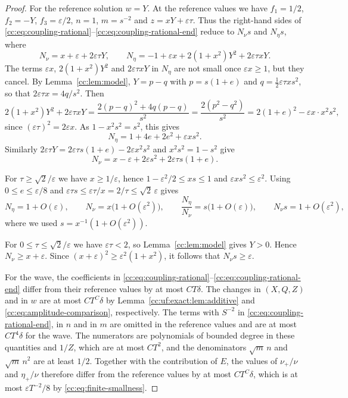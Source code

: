 \begin{proof}
For the reference solution $w=Y$. At the reference values we have
$f_1=1/2$, $f_2=-Y$, $f_3=\varepsilon/2$, $n=1$, $m=s^{-2}$ and
$z=xY+\varepsilon\tau$. Thus the right-hand sides of
\eqref{cc:eq:coupling-rational}--\eqref{cc:eq:coupling-rational-end}
reduce to $N_\nu s$ and $N_\eta s$, where
\[
 N_\nu=x+\varepsilon+2\varepsilon\tau Y,\qquad
 N_\eta=-1+\varepsilon x+2(1+x^2)Y^2+2\varepsilon\tau xY.
\]
The terms $\varepsilon x$, $2(1+x^2)Y^2$ and $2\varepsilon\tau xY$ in
$N_\eta$ are not small once $\varepsilon x\ge1$, but they cancel. By
Lemma~\ref{cc:lem:model}, $Y=p-q$ with $p=s(1+e)$ and
$q=\tfrac12\varepsilon\tau xs^2$, so that $2\varepsilon\tau x=4q/s^2$.
Then
\[
 2(1+x^2)Y^2+2\varepsilon\tau xY
 =\frac{2(p-q)^2+4q(p-q)}{s^2}=\frac{2(p^2-q^2)}{s^2}
 =2(1+e)^2-\varepsilon x\cdot x^2s^2,
\]
since $(\varepsilon\tau)^2=2\varepsilon x$. As $1-x^2s^2=s^2$, this
gives
\[
 N_\eta=1+4e+2e^2+\varepsilon xs^2.
\]
Similarly $2\varepsilon\tau Y=2\varepsilon\tau s(1+e)-2\varepsilon x^2s^2$
and $x^2s^2=1-s^2$ give
\[
 N_\nu=x-\varepsilon+2\varepsilon s^2+2\varepsilon\tau s(1+e).
\]

For $\tau\ge\sqrt2/\varepsilon$ we have $x\ge1/\varepsilon$, hence
$1-\varepsilon^2/2\le xs\le1$ and $\varepsilon xs^2\le\varepsilon^2$.
Using $0\le e\le\varepsilon/8$ and
$\varepsilon\tau s\le\varepsilon\tau/x=2/\tau\le\sqrt2\,\varepsilon$ gives
\[
 N_\eta=1+O(\varepsilon),\qquad N_\nu=x\bigl(1+O(\varepsilon^2)\bigr),
 \qquad \frac{N_\eta}{N_\nu}=s\bigl(1+O(\varepsilon)\bigr),
 \qquad N_\nu s=1+O(\varepsilon^2),
\]
where we used $s=x^{-1}(1+O(\varepsilon^2))$.

For $0\le\tau\le\sqrt2/\varepsilon$ we have $\varepsilon\tau<2$,
so Lemma~\ref{cc:lem:model} gives $Y>0$. Hence
$N_\nu\ge x+\varepsilon$. Since
$(x+\varepsilon)^2\ge\varepsilon^2(1+x^2)$, it follows that
$N_\nu s\ge\varepsilon$.

For the wave, the coefficients in
\eqref{cc:eq:coupling-rational}--\eqref{cc:eq:coupling-rational-end}
differ from their reference values by at most $CT\delta$.
The changes in $(X,Q,Z)$ and in $w$ are at most $CT^C\delta$
by Lemma~\ref{cc:uf:exact:lem:additive} and
\eqref{cc:eq:amplitude-comparison}, respectively. The terms with
$S^{-2}$ in \eqref{cc:eq:coupling-rational-end}, in $n$ and in $m$
are omitted in the reference values and are at most $CT^4\delta$ for the wave. The
numerators are polynomials of bounded degree in these quantities and
$1/Z$, which are at most $CT^2$, and the denominators $\sqrt m\,n$ and
$\sqrt m\,n^2$ are at least $1/2$. Together with the contribution of
$E$, the values of $\nu_+/\nu$ and $\eta_+/\nu$ therefore differ from
the reference values by at most $CT^C\delta$, which is at most
$\varepsilon T^{-2}/8$ by \eqref{cc:eq:finite-smallness}.


\end{proof}
